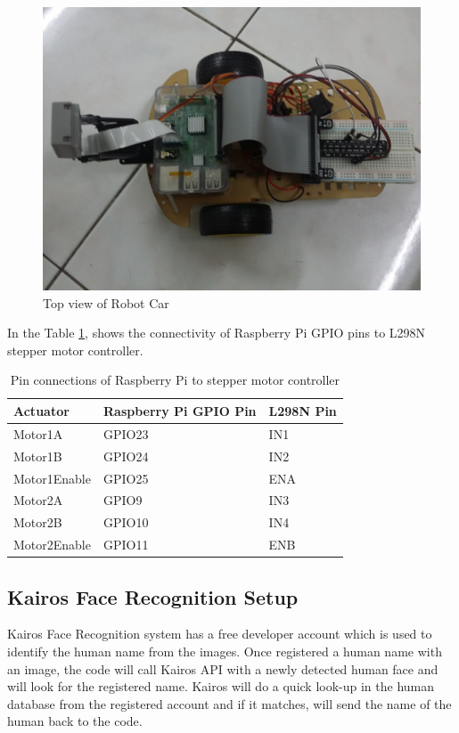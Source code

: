 \documentclass[sigconf]{acmart}
\begin{document}
\begin{figure}[htb]
  \includegraphics[width=0.8\columnwidth]{images/RobotCar_TopView.jpg}
  \caption{Top view of Robot Car}\label{F:robottop}
\end{figure}


In the Table \ref{T:pinlayout}, shows the connectivity of Raspberry Pi GPIO pins to L298N stepper motor controller.

\begin{table}[htb]
\caption{Pin connections of Raspberry Pi to stepper motor controller}\label{T:pinlayout}
\begin{tabular}{lll}
Actuator & Raspberry Pi GPIO Pin & L298N Pin \\
\hline
    Motor1A & GPIO23 & IN1 \\
    Motor1B & GPIO24 & IN2 \\
    Motor1Enable & GPIO25 & ENA \\
    Motor2A & GPIO9 & IN3 \\
    Motor2B & GPIO10 & IN4 \\
    Motor2Enable & GPIO11 & ENB \\
\end{tabular}
\end{table}


\subsection{Kairos Face Recognition Setup}
Kairos Face Recognition system has a free developer account which is used to identify the human name from the images. Once registered a human name with an image, the code will call Kairos API with a newly detected human face and will look for the registered name. Kairos will do a quick look-up in the human database from the registered account and if it matches, will send the name of the human back to the code.
\end{document}
